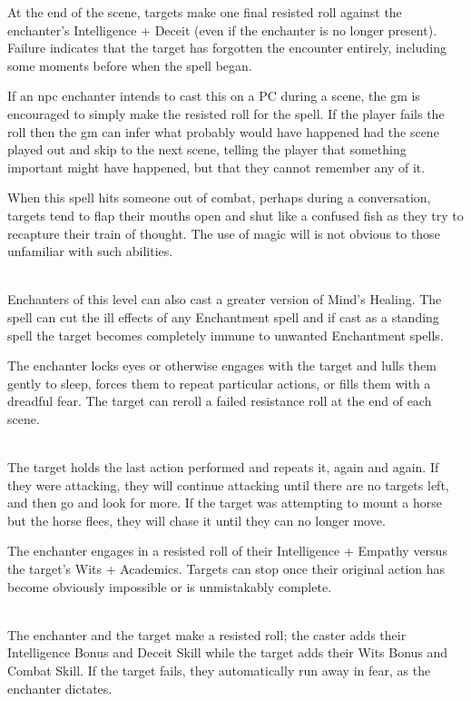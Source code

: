 \begin{multicols}{2}
At the end of the scene, targets make one final resisted roll against the enchanter's Intelligence + Deceit (even if the enchanter is no longer present). Failure indicates that the target has forgotten the encounter entirely, including some moments before when the spell began.

If an \gls{npc} enchanter intends to cast this on a PC during a scene, the \gls{gm} is encouraged to simply make the resisted roll for the spell. If the player fails the roll then the \gls{gm} can infer what probably would have happened had the scene played out and skip to the next scene, telling the player that something important might have happened, but that they cannot remember any of it.

When this spell hits someone out of combat, perhaps during a conversation, targets tend to flap their mouths open and shut like a confused fish as they try to recapture their train of thought. The use of magic will is not obvious to those unfamiliar with such abilities.

\\
Enchanters of this level can also cast a greater version of Mind's Healing. The spell can cut the ill effects of any Enchantment spell and if cast as a standing spell the target becomes completely immune to unwanted Enchantment spells.

\spelllevel

The enchanter locks eyes or otherwise engages with the target and lulls them gently to sleep, forces them to repeat particular actions, or fills them with a dreadful fear. The target can reroll a failed resistance roll at the end of each scene.

\\
The target holds the last action performed and repeats it, again and again.
If they were attacking, they will continue attacking until there are no targets left, and then go and look for more.
If the target was attempting to mount a horse but the horse flees, they will chase it until they can no longer move.

The enchanter engages in a resisted roll of their Intelligence + Empathy versus the target's Wits + Academics.
Targets can stop once their original action has become obviously impossible or is unmistakably complete.

\\
The enchanter and the target make a resisted roll; the caster adds their Intelligence Bonus and Deceit Skill while the target adds their Wits Bonus and Combat Skill. If the target fails, they automatically run away in fear, as the enchanter dictates.


\end{multicols}
